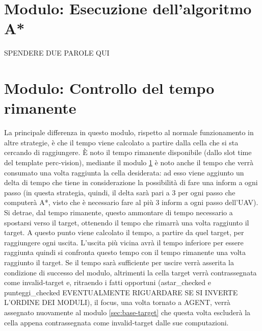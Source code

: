 \section{Modulo: Esecuzione dell'algoritmo A*} \label{sec:base-astar}
{\color{red}SPENDERE DUE PAROLE QUI}

\section{Modulo: Controllo del tempo rimanente} \label{sec:base-tempo}
La principale differenza in questo modulo, rispetto al normale funzionamento in altre strategie, è che il tempo viene calcolato a partire dalla cella che si sta cercando di raggiungere. È noto il tempo rimanente disponibile (dallo slot time del template perc-vision), mediante il modulo \ref{sec:base-astar} è noto anche il tempo che verrà consumato una volta raggiunta la cella desiderata: ad esso viene aggiunto un delta di tempo che tiene in considerazione la possibilità di fare una inform a ogni passo (in questa strategia, quindi, il delta sarà pari a 3 per ogni passo che computerà A*, visto che è necessario fare al più 3 inform a ogni passo dell'UAV). Si detrae, dal tempo rimanente, questo ammontare di tempo necessario a spostarsi verso il target, ottenendo il tempo che rimarrà una volta raggiunto il target. A questo punto viene calcolato il tempo, a partire da quel target, per raggiungere ogni uscita. L'uscita più vicina avrà il tempo inferiore per essere raggiunta quindi si confronta questo tempo con il tempo rimanente una volta raggiunto il target. Se il tempo sarà sufficiente per uscire verrà asserita la condizione di successo del modulo, altrimenti la cella target verrà contrassegnata come invalid-target e, ritraendo i fatti opportuni (astar\_checked e punteggi\_checked {\color{red} EVENTUALMENTE RIGUARDARE SE SI INVERTE L'ORDINE DEI MODULI}), il focus, una volta tornato a AGENT, verrà assegnato nuovamente al modulo \ref{sec:base-target} che questa volta escluderà la cella appena contrassegnata come invalid-target dalle sue computazioni.

